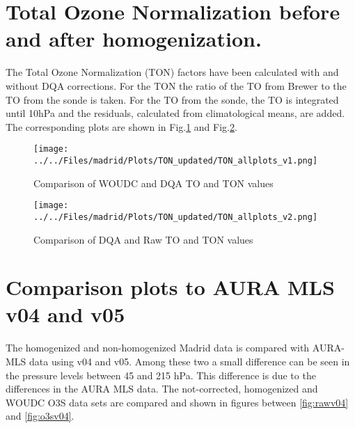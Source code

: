 \section{Total Ozone Normalization before and after homogenization.}

The Total Ozone Normalization (TON) factors have been calculated with and without DQA corrections. For the TON the ratio of the
TO from Brewer to the TO from the sonde is taken. For the TO from the sonde, the TO is integrated until 10hPa and the residuals, calculated from
climatological means, are added. The corresponding plots are shown in Fig.\ref{fig:ton1} and  Fig.\ref{fig:ton2}.

                                                \begin{figure}
        \centering
\texttt{[image: ../../Files/madrid/Plots/TON\_updated/TON\_allplots\_v1.png]}
    \caption{Comparison of WOUDC and DQA TO and TON values}
            \label{fig:ton1}
    \end{figure}

                                                \begin{figure}
        \centering
\texttt{[image: ../../Files/madrid/Plots/TON\_updated/TON\_allplots\_v2.png]}
    \caption{Comparison of DQA and Raw TO and TON values}
            \label{fig:ton2}
    \end{figure}


\section{Comparison plots to AURA MLS v04 and v05}

    The homogenized and non-homogenized Madrid data is compared with AURA-MLS data using v04 and v05. Among these two a small difference
    can be seen in the pressure levels between 45 and 215 hPa. This difference is due to the differences in the AURA MLS data.
    The not-corrected, homogenized and WOUDC O3S data sets are compared and shown in figures between
\ref{fig:rawv04} and \ref{fig:o3sv04}.

